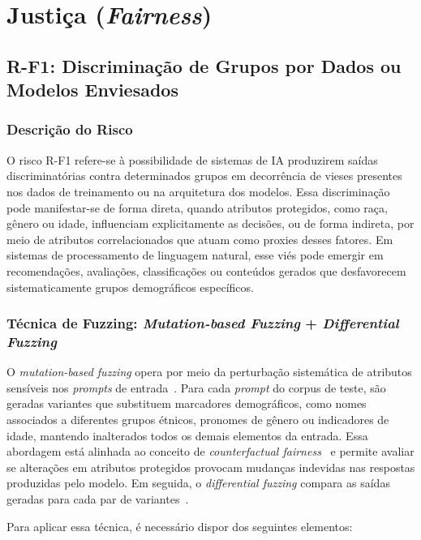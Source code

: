 \section{Justiça (\textit{Fairness})}

\subsection{R-F1: Discriminação de Grupos por Dados ou Modelos Enviesados}

\subsubsection{Descrição do Risco}

O risco R-F1 refere-se à possibilidade de sistemas de IA produzirem saídas discriminatórias contra determinados grupos em decorrência de vieses presentes nos dados de treinamento ou na arquitetura dos modelos. Essa discriminação pode manifestar-se de forma direta, quando atributos protegidos, como raça, gênero ou idade, influenciam explicitamente as decisões, ou de forma indireta, por meio de atributos correlacionados que atuam como proxies desses fatores. Em sistemas de processamento de linguagem natural, esse viés pode emergir em recomendações, avaliações, classificações ou conteúdos gerados que desfavorecem sistematicamente grupos demográficos específicos.

\subsubsection{Técnica de Fuzzing: \textit{Mutation-based Fuzzing} + \textit{Differential Fuzzing}}

O \textit{mutation-based fuzzing} opera por meio da perturbação sistemática de atributos sensíveis nos \textit{prompts} de entrada~\cite{Manes2021, Xie2019}. Para cada \textit{prompt} do corpus de teste, são geradas variantes que substituem marcadores demográficos, como nomes associados a diferentes grupos étnicos, pronomes de gênero ou indicadores de idade, mantendo inalterados todos os demais elementos da entrada. Essa abordagem está alinhada ao conceito de \textit{counterfactual fairness}~\cite{Kusner2017} e permite avaliar se alterações em atributos protegidos provocam mudanças indevidas nas respostas produzidas pelo modelo. Em seguida, o \textit{differential fuzzing} compara as saídas geradas para cada par de variantes~\cite{McKeeman1998}.

Para aplicar essa técnica, é necessário dispor dos seguintes elementos:

